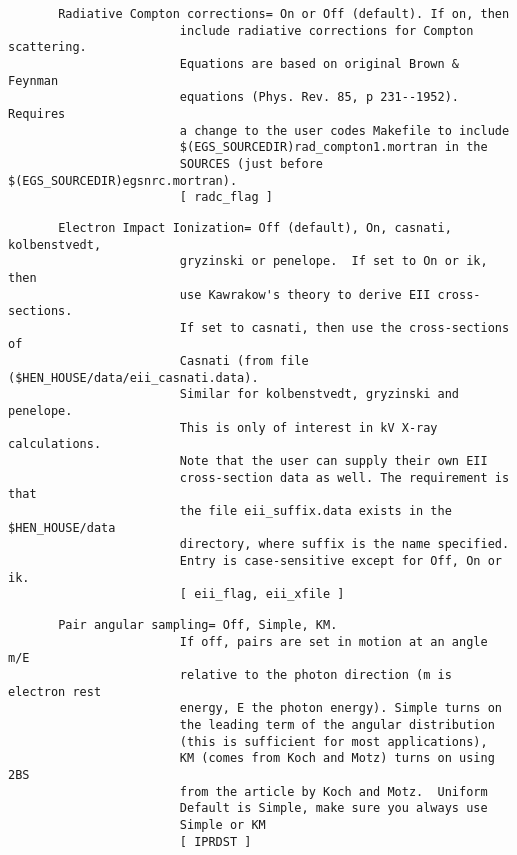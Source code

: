 \begin{verbatim}
       Radiative Compton corrections= On or Off (default). If on, then
                        include radiative corrections for Compton scattering.
                        Equations are based on original Brown & Feynman
                        equations (Phys. Rev. 85, p 231--1952).  Requires
                        a change to the user codes Makefile to include
                        $(EGS_SOURCEDIR)rad_compton1.mortran in the 
                        SOURCES (just before $(EGS_SOURCEDIR)egsnrc.mortran).
                        [ radc_flag ]
\end{verbatim}
\begin{verbatim}
       Electron Impact Ionization= Off (default), On, casnati, kolbenstvedt,
                        gryzinski or penelope.  If set to On or ik, then 
                        use Kawrakow's theory to derive EII cross-sections.
                        If set to casnati, then use the cross-sections of 
                        Casnati (from file ($HEN_HOUSE/data/eii_casnati.data).
                        Similar for kolbenstvedt, gryzinski and penelope. 
                        This is only of interest in kV X-ray calculations.
                        Note that the user can supply their own EII 
                        cross-section data as well. The requirement is that
                        the file eii_suffix.data exists in the $HEN_HOUSE/data
                        directory, where suffix is the name specified.
                        Entry is case-sensitive except for Off, On or ik.
                        [ eii_flag, eii_xfile ]
\end{verbatim}
\begin{verbatim}
       Pair angular sampling= Off, Simple, KM.
                        If off, pairs are set in motion at an angle m/E
                        relative to the photon direction (m is electron rest
                        energy, E the photon energy). Simple turns on
                        the leading term of the angular distribution
                        (this is sufficient for most applications),
                        KM (comes from Koch and Motz) turns on using 2BS
                        from the article by Koch and Motz.  Uniform
                        Default is Simple, make sure you always use 
                        Simple or KM
                        [ IPRDST ]
\end{verbatim}
